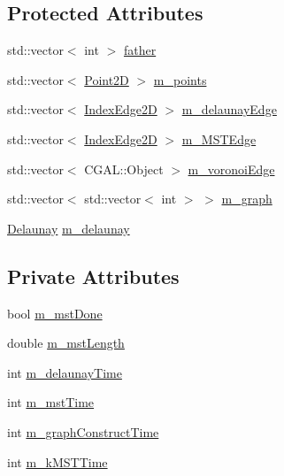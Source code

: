 \subsection*{Protected Attributes}
\begin{DoxyCompactItemize}
\item 
std::vector$<$ int $>$ \hyperlink{classcmst_1_1_graph2_d_ad5d251f2f6f8b827af4404985fcec53c}{father}
\item 
std::vector$<$ \hyperlink{classcmst_1_1_point2_d}{Point2D} $>$ \hyperlink{classcmst_1_1_graph2_d_a32456f3c630e34a56ce3109183142c10}{m\_points}
\item 
std::vector$<$ \hyperlink{classcmst_1_1_index_edge2_d}{IndexEdge2D} $>$ \hyperlink{classcmst_1_1_graph2_d_a6fe64b2078ec3c700a8a2e2bd77e2dae}{m\_delaunayEdge}
\item 
std::vector$<$ \hyperlink{classcmst_1_1_index_edge2_d}{IndexEdge2D} $>$ \hyperlink{classcmst_1_1_graph2_d_a1cc96b5251162964ac21f46955ac8271}{m\_MSTEdge}
\item 
std::vector$<$ CGAL::Object $>$ \hyperlink{classcmst_1_1_graph2_d_a05e5ea6746bfd9d0ccd47308f4bbf1af}{m\_voronoiEdge}
\item 
std::vector$<$ std::vector$<$ int $>$ $>$ \hyperlink{classcmst_1_1_graph2_d_a5df9c78edb4f5c68da11b01e44061dc5}{m\_graph}
\item 
\hyperlink{class_delaunay}{Delaunay} \hyperlink{classcmst_1_1_graph2_d_af19557df59901e6078c2038652c95623}{m\_delaunay}
\end{DoxyCompactItemize}
\subsection*{Private Attributes}
\begin{DoxyCompactItemize}
\item 
bool \hyperlink{classcmst_1_1_graph2_d_ab7c087fe87b5750195100ff25f10f628}{m\_mstDone}
\item 
double \hyperlink{classcmst_1_1_graph2_d_a722498b25b96d26e68e378ba970d5e65}{m\_mstLength}
\item 
int \hyperlink{classcmst_1_1_graph2_d_a869a2fef63a6dbc8733056afd9ad0b71}{m\_delaunayTime}
\item 
int \hyperlink{classcmst_1_1_graph2_d_a447f3d36666c57d2f15bddc1e3126f1e}{m\_mstTime}
\item 
int \hyperlink{classcmst_1_1_graph2_d_ac594da90a2c9bd7332644532969ef11f}{m\_graphConstructTime}
\item 
int \hyperlink{classcmst_1_1_graph2_d_a647ad467e7c301503a9ed46fd0eab494}{m\_kMSTTime}
\end{DoxyCompactItemize}


